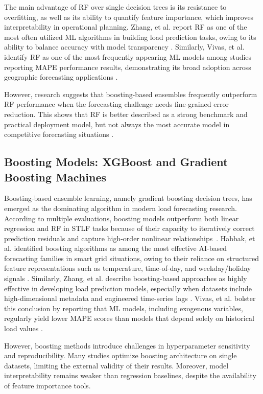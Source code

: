 \documentclass[conference]{IEEEtran}
\begin{document}
The main advantage of RF over single decision trees is its resistance to overfitting, as well as its ability to quantify feature importance, which improves interpretability in operational planning. Zhang, et al. \cite{zhang2021} report RF as one of the most often utilized ML algorithms in building load prediction tasks, owing to its ability to balance accuracy with model transparency \cite{zhang2021}. Similarly, Vivas, et al. \cite{vivas2020} identify RF as one of the most frequently appearing ML models among studies reporting MAPE performance results, demonstrating its broad adoption across geographic forecasting applications \cite{vivas2020}.

However, research suggests that boosting-based ensembles frequently outperform RF performance when the forecasting challenge needs fine-grained error reduction. This shows that RF is better described as a strong benchmark and practical deployment model, but not always the most accurate model in competitive forecasting situations \cite{habbak2023,zhang2021}.

\subsection{Boosting Models: XGBoost and Gradient Boosting Machines}

Boosting-based ensemble learning, namely gradient boosting decision trees, has emerged as the dominating algorithm in modern load forecasting research. According to multiple evaluations, boosting models outperform both linear regression and RF in STLF tasks because of their capacity to iteratively correct prediction residuals and capture high-order nonlinear relationships~\cite{azeem2021,habbak2023}. Habbak, et al. \cite{habbak2023} identified boosting algorithms as among the most effective AI-based forecasting families in smart grid situations, owing to their reliance on structured feature representations such as temperature, time-of-day, and weekday/holiday signals \cite{habbak2023}. Similarly, Zhang, et al. \cite{zhang2021} describe boosting-based approaches as highly effective in developing load prediction models, especially when datasets include high-dimensional metadata and engineered time-series lags \cite{zhang2021}. Vivas, et al. \cite{vivas2020} bolster this conclusion by reporting that ML models, including exogenous variables, regularly yield lower MAPE scores than models that depend solely on historical load values \cite{vivas2020}.

However, boosting methods introduce challenges in hyperparameter sensitivity and reproducibility. Many studies optimize boosting architecture on single datasets, limiting the external validity of their results. Moreover, model interpretability remains weaker than regression baselines, despite the availability of feature importance tools.
\end{document}
